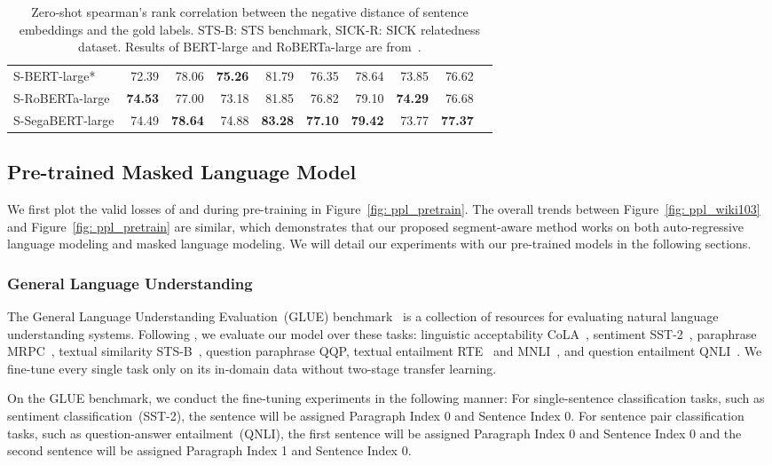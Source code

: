 \documentclass[letterpaper]{article}
\begin{document}
\begin{table*}[ht!]
\begin{tabular}{lrrrrrrrrr}
  S-BERT-large* &72.39 &78.06 &\textbf{75.26} &81.79 &76.35 &78.64 &73.85 &76.62 \\
  S-RoBERTa-large &\textbf{74.53} &77.00 &73.18 &81.85 &76.82 &79.10 &\textbf{74.29} &76.68 \\
  \hline
  S-SegaBERT-large &74.49 &\textbf{78.64} &74.88 &\textbf{83.28} &\textbf{77.10} &\textbf{79.42} &73.77 &\textbf{77.37} \\  \bottomrule
  \end{tabular}
  \caption{Zero-shot spearman's rank correlation  between the negative distance of sentence embeddings and the gold labels. STS-B: STS benchmark, SICK-R: SICK relatedness dataset. Results of BERT-large and RoBERTa-large are from~\citet{DBLP:conf/emnlp/sbert}.}\label{tab: sts-zeroshot}
  \scriptsize
  \end{table*} 

\subsection{Pre-trained Masked Language Model}
We first plot the valid losses of  and  during pre-training in Figure~\ref{fig: ppl_pretrain}.
The overall trends between Figure~\ref{fig: ppl_wiki103} and Figure~\ref{fig: ppl_pretrain} are similar, which demonstrates that our proposed segment-aware method works on both auto-regressive language modeling and masked language modeling.
We will detail our experiments with our pre-trained models in the following sections.

\subsubsection{General Language Understanding}
The General Language Understanding Evaluation~(GLUE) benchmark~\cite{DBLP:conf/iclr/glue} is a collection of resources for evaluating natural language understanding systems. 
Following \citet{DBLP:journals/corr/bert}, we evaluate our model over these tasks: linguistic acceptability CoLA~\cite{cola}, sentiment SST-2~\cite{sst2}, paraphrase MRPC~\cite{mrpc}, textual similarity STS-B~\cite{sts-b}, question paraphrase QQP, textual entailment RTE~\cite{rte} and MNLI~\cite{mnli}, and question entailment QNLI~\cite{DBLP:conf/iclr/glue}. 
We fine-tune every single task only on its in-domain data without two-stage transfer learning.

On the GLUE benchmark, we conduct the fine-tuning experiments in the following manner: For single-sentence classification tasks, such as sentiment classification~(SST-2), the sentence will be assigned Paragraph Index 0 and Sentence Index 0.
For sentence pair classification tasks, such as question-answer entailment~(QNLI), the first sentence will be assigned Paragraph Index 0 and Sentence Index 0 and the second sentence will be assigned Paragraph Index 1 and Sentence Index 0. 
\end{document}
